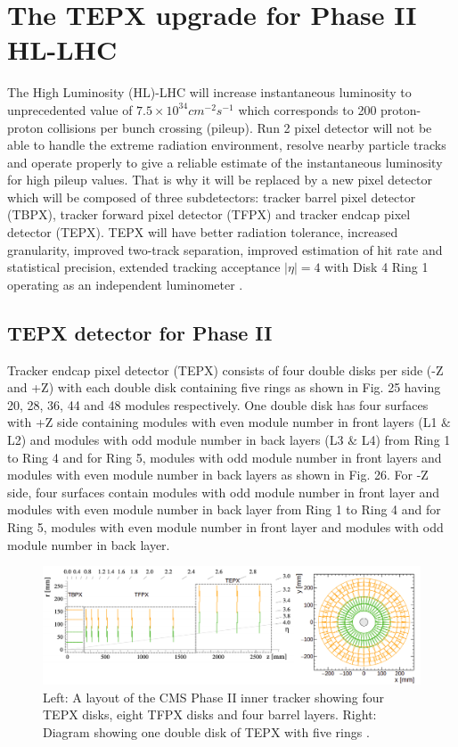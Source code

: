  \section{The TEPX upgrade for Phase II HL-LHC}
\label{sec:tepx}

The High Luminosity (HL)-LHC will increase instantaneous luminosity to unprecedented value of $7.5 \times 10^{34} cm^{-2} s^{-1}$ which corresponds to 200 proton-proton collisions per bunch crossing (pileup). Run 2 pixel detector will not be able to handle the extreme radiation environment, resolve nearby particle tracks and operate properly to give a reliable estimate of the instantaneous luminosity for high pileup values. That is why it will be replaced by a new pixel detector which will be composed of three subdetectors: tracker barrel pixel detector (TBPX), tracker forward pixel detector (TFPX) and tracker endcap pixel detector (TEPX). TEPX will have better radiation tolerance, increased granularity, improved two-track separation, improved estimation of hit rate and statistical precision, extended tracking acceptance $|\eta|=4$ with Disk 4 Ring 1 operating as an independent luminometer \cite{Klein:2017nke}. \\


\subsection{TEPX detector for Phase II}

Tracker endcap pixel detector (TEPX) consists of four double disks per side (-Z and +Z) with each double disk containing five rings as shown in Fig. 25 having 20, 28, 36, 44 and 48 modules respectively. One double disk has four surfaces with +Z side containing modules with even module number in front layers (L1 $\&$ L2) and modules with odd module number in back layers (L3 $\&$ L4) from Ring 1 to Ring 4 and for Ring 5, modules with odd module number in front layers and modules with even module number in back layers as shown in Fig. 26. For -Z side, four surfaces contain modules with odd module number in front layer and modules with even module number in back layer from Ring 1 to Ring 4 and for Ring 5, modules with even module number in front layer and modules with odd module number in back layer. \\


\begin{figure}[H]
  \centering
  \includegraphics[width=1 \columnwidth]{./tepx_tt.png}
  \caption{ \onehalfspacing Left: A layout of the CMS Phase II inner tracker showing four TEPX disks, eight TFPX disks and four barrel layers. Right: Diagram showing one double disk of TEPX with five rings \cite{Klein:2017nke}.}
  \label{fig:CMS}
\end{figure}


